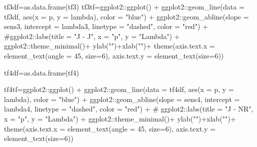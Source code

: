 \documentclass[
  12pt,
  letterpaper,
]{book}
\newenvironment{Shaded}{\begin{snugshade}}{\end{snugshade}}
\newcommand{\AttributeTok}[1]{\textcolor[rgb]{0.40,0.45,0.13}{#1}}
\newcommand{\CommentTok}[1]{\textcolor[rgb]{0.37,0.37,0.37}{#1}}
\newcommand{\DecValTok}[1]{\textcolor[rgb]{0.68,0.00,0.00}{#1}}
\newcommand{\FunctionTok}[1]{\textcolor[rgb]{0.28,0.35,0.67}{#1}}
\newcommand{\NormalTok}[1]{\textcolor[rgb]{0.00,0.23,0.31}{#1}}
\newcommand{\OtherTok}[1]{\textcolor[rgb]{0.00,0.23,0.31}{#1}}
\newcommand{\SpecialCharTok}[1]{\textcolor[rgb]{0.37,0.37,0.37}{#1}}
\newcommand{\StringTok}[1]{\textcolor[rgb]{0.13,0.47,0.30}{#1}}
\begin{document}
\begin{Shaded}
\begin{Highlighting}[]
\NormalTok{tf3df}\OtherTok{=}\FunctionTok{as.data.frame}\NormalTok{(tf3)}
\NormalTok{tf3tf}\OtherTok{=}\NormalTok{ggplot2}\SpecialCharTok{::}\FunctionTok{ggplot}\NormalTok{() }\SpecialCharTok{+}
\NormalTok{  ggplot2}\SpecialCharTok{::}\FunctionTok{geom\_line}\NormalTok{(}\AttributeTok{data =}\NormalTok{ tf3df, }\FunctionTok{aes}\NormalTok{(}\AttributeTok{x =}\NormalTok{ p, }\AttributeTok{y =}\NormalTok{ lambda), }\AttributeTok{color =} \StringTok{"blue"}\NormalTok{) }\SpecialCharTok{+}
\NormalTok{  ggplot2}\SpecialCharTok{::}\FunctionTok{geom\_abline}\NormalTok{(}\AttributeTok{slope =}\NormalTok{ sens3, }\AttributeTok{intercept =}\NormalTok{ lambda3, }\AttributeTok{linetype =} \StringTok{"dashed"}\NormalTok{, }\AttributeTok{color =} \StringTok{"red"}\NormalTok{) }\SpecialCharTok{+}
  \CommentTok{\#ggplot2::labs(title = "J {-} J", x = "p", y = "Lambda") +}
\NormalTok{  ggplot2}\SpecialCharTok{::}\FunctionTok{theme\_minimal}\NormalTok{()}\SpecialCharTok{+}
  \FunctionTok{ylab}\NormalTok{(}\StringTok{""}\NormalTok{)}\SpecialCharTok{+}\FunctionTok{xlab}\NormalTok{(}\StringTok{""}\NormalTok{)}\SpecialCharTok{+}
  \FunctionTok{theme}\NormalTok{(}\AttributeTok{axis.text.x =} \FunctionTok{element\_text}\NormalTok{(}\AttributeTok{angle =} \DecValTok{45}\NormalTok{, }\AttributeTok{size=}\DecValTok{6}\NormalTok{),}
        \AttributeTok{axis.text.y =} \FunctionTok{element\_text}\NormalTok{(}\AttributeTok{size=}\DecValTok{6}\NormalTok{))}

\NormalTok{tf4df}\OtherTok{=}\FunctionTok{as.data.frame}\NormalTok{(tf4)}

\NormalTok{tf4tf}\OtherTok{=}\NormalTok{ggplot2}\SpecialCharTok{::}\FunctionTok{ggplot}\NormalTok{() }\SpecialCharTok{+}
\NormalTok{  ggplot2}\SpecialCharTok{::}\FunctionTok{geom\_line}\NormalTok{(}\AttributeTok{data =}\NormalTok{ tf4df, }\FunctionTok{aes}\NormalTok{(}\AttributeTok{x =}\NormalTok{ p, }\AttributeTok{y =}\NormalTok{ lambda), }\AttributeTok{color =} \StringTok{"blue"}\NormalTok{) }\SpecialCharTok{+}
\NormalTok{  ggplot2}\SpecialCharTok{::}\FunctionTok{geom\_abline}\NormalTok{(}\AttributeTok{slope =}\NormalTok{ sens4, }\AttributeTok{intercept =}\NormalTok{ lambda4, }\AttributeTok{linetype =} \StringTok{"dashed"}\NormalTok{, }\AttributeTok{color =} \StringTok{"red"}\NormalTok{) }\SpecialCharTok{+}
 \CommentTok{\# ggplot2::labs(title = "J {-} NR", x = "p", y = "Lambda") +}
\NormalTok{  ggplot2}\SpecialCharTok{::}\FunctionTok{theme\_minimal}\NormalTok{()}\SpecialCharTok{+}
  \FunctionTok{ylab}\NormalTok{(}\StringTok{""}\NormalTok{)}\SpecialCharTok{+}\FunctionTok{xlab}\NormalTok{(}\StringTok{""}\NormalTok{)}\SpecialCharTok{+}
  \FunctionTok{theme}\NormalTok{(}\AttributeTok{axis.text.x =} \FunctionTok{element\_text}\NormalTok{(}\AttributeTok{angle =} \DecValTok{45}\NormalTok{, }\AttributeTok{size=}\DecValTok{6}\NormalTok{),}
        \AttributeTok{axis.text.y =} \FunctionTok{element\_text}\NormalTok{(}\AttributeTok{size=}\DecValTok{6}\NormalTok{))}


\end{Highlighting}
\end{Shaded}
\end{document}
